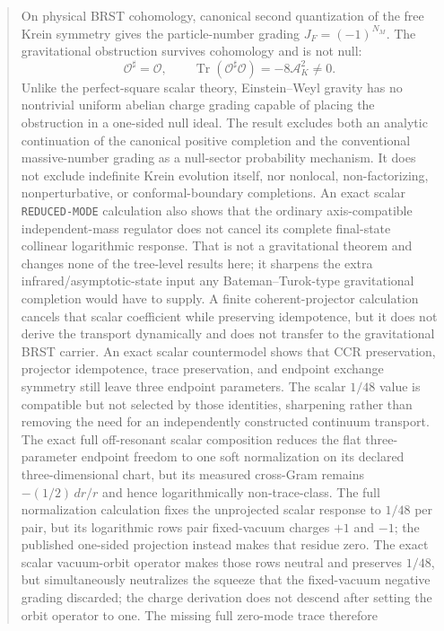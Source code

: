 \documentclass[11pt]{article}
\theoremstyle{definition}
\theoremstyle{remark}
\newcommand{\Tr}{\operatorname{Tr}}
\newcommand{\AK}{\mathcal A_K}
\begin{document}
\begin{abstract}
On physical BRST cohomology, canonical second quantization of the free
Krein symmetry gives the particle-number grading $J_F=(-1)^{N_M}$.
The gravitational obstruction survives cohomology and is not null:
\begin{equation*}
\mathcal O^\sharp=\mathcal O,
\qquad
\Tr(\mathcal O^\sharp\mathcal O)=-8\AK^2\ne0 .
\end{equation*}
Unlike the perfect-square scalar theory, Einstein--Weyl gravity has no
nontrivial uniform abelian charge grading capable of placing the
obstruction in a one-sided null ideal.  The result excludes both an
analytic continuation of the canonical positive completion and the
conventional massive-number grading as a null-sector probability
mechanism.  It does not exclude indefinite Krein evolution itself, nor
nonlocal, non-factorizing, nonperturbative, or conformal-boundary
completions.  An exact scalar \texttt{REDUCED-MODE} calculation also
shows that the ordinary axis-compatible independent-mass regulator does not
cancel its complete final-state collinear logarithmic response.  That
is not a gravitational theorem and changes none of the tree-level results
here; it sharpens the extra infrared/asymptotic-state input any
Bateman--Turok-type gravitational completion would have to supply.
A finite coherent-projector calculation cancels that scalar coefficient while
preserving idempotence, but it does not derive the transport dynamically and
does not transfer to the gravitational BRST carrier.  An exact
scalar countermodel shows that CCR preservation, projector idempotence, trace
preservation, and endpoint exchange symmetry still leave three endpoint
parameters.  The scalar $1/48$ value is compatible but not selected by those
identities, sharpening rather than removing the need for an independently
constructed continuum transport.  The exact full off-resonant scalar
composition reduces the flat three-parameter endpoint freedom to one soft
normalization on its declared three-dimensional chart, but its measured
cross-Gram remains $-(1/2)\,dr/r$ and hence logarithmically non-trace-class.
The full normalization calculation fixes the unprojected scalar response to
$1/48$ per pair, but its logarithmic rows pair fixed-vacuum charges $+1$ and
$-1$; the published one-sided projection instead makes that residue zero.
The exact scalar vacuum-orbit operator makes those rows neutral and preserves
$1/48$, but simultaneously neutralizes the squeeze that the fixed-vacuum
negative grading discarded; the charge derivation does not descend after
setting the orbit operator to one.  The missing full zero-mode trace therefore

\end{abstract}
\end{document}
